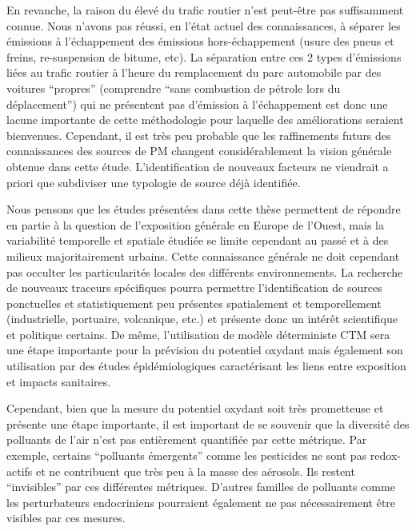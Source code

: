 En revanche, la raison du \POv{} élevé du trafic routier n'est peut-être pas suffisamment
connue.
Nous n'avons pas réussi, en l'état actuel des connaissances, à séparer les émissions à
l'échappement des émissions hors-échappement (usure des pneus et freins, re-suspension de
bitume, etc). 
La séparation entre ces 2 types d'émissions liées au trafic routier à l'heure du
remplacement du parc automobile par des voitures ``propres'' (comprendre ``sans combustion
de pétrole lors du déplacement'') qui ne présentent pas d'émission à l'échappement 
est donc une lacune importante de cette méthodologie pour laquelle des améliorations
seraient bienvenues.
Cependant, il est très peu probable que les raffinements futurs des connaissances des sources de
PM changent considérablement la vision générale obtenue dans cette étude. L'identification de nouveaux
facteurs ne viendrait a priori que subdiviser une typologie de source déjà identifiée.

Nous pensons que les études présentées dans cette thèse permettent de répondre en partie à
la question de l'exposition générale en Europe de l'Ouest, mais la variabilité temporelle
et spatiale étudiée se limite cependant au passé et à des milieux majoritairement urbains.
Cette connaissance générale ne doit cependant pas occulter les particularités locales des
différents environnements.
La recherche de nouveaux traceurs spécifiques pourra permettre l'identification de sources
ponctuelles et statistiquement peu présentes spatialement et temporellement
(industrielle, portuaire, volcanique, etc.) et présente donc un intérêt scientifique et
politique certains.
De même, l'utilisation de modèle déterministe CTM sera une étape importante pour la
prévision du potentiel oxydant mais également son utilisation par des études
épidémiologiques caractérisant les liens entre exposition et impacts sanitaires.

Cependant, bien que la mesure du potentiel oxydant soit très prometteuse et présente une
étape importante, il est important de se souvenir que la diversité des polluants de l'air
n'est pas entièrement quantifiée par cette métrique.  Par exemple, certains ``polluants
émergents'' comme les pesticides ne sont pas redox-actifs et ne contribuent que très peu à
la masse des aérosols. Ils restent ``invisibles'' par ces différentes métriques. D'autres
familles de polluants comme les perturbateurs endocriniens pourraient
également ne pas nécessairement être visibles par ces mesures.


